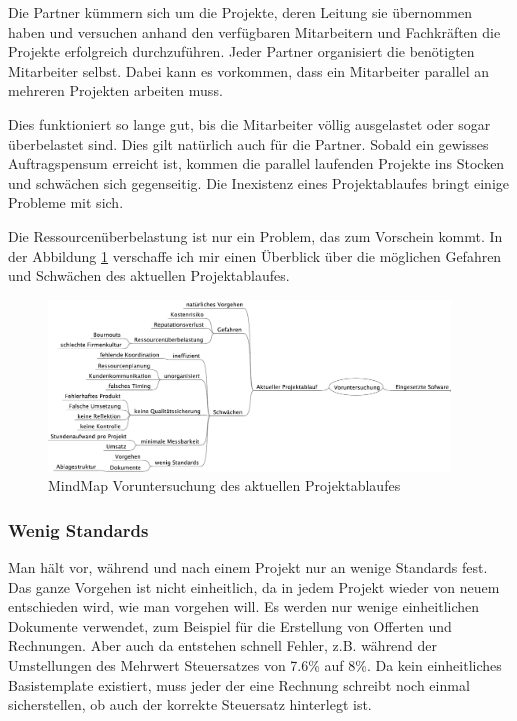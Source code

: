 Die Partner kümmern sich um die Projekte, deren Leitung sie übernommen haben
und versuchen anhand den verfügbaren Mitarbeitern und Fachkräften die Projekte 
erfolgreich durchzuführen. Jeder Partner organisiert die benötigten Mitarbeiter
selbst. Dabei kann es vorkommen, dass ein Mitarbeiter parallel an
mehreren Projekten arbeiten muss.

Dies funktioniert so lange gut, bis die Mitarbeiter völlig ausgelastet oder sogar
überbelastet sind. Dies gilt natürlich auch für die Partner. Sobald ein gewisses 
Auftragspensum erreicht ist, kommen die parallel laufenden Projekte ins Stocken 
und schwächen sich gegenseitig. Die Inexistenz eines Projektablaufes bringt
einige Probleme mit sich.

Die Ressourcenüberbelastung ist nur ein Problem, das zum Vorschein kommt. In der
Abbildung \ref{pic:voruntersuchung_projektablauf} verschaffe ich mir einen 
Überblick über die möglichen Gefahren und Schwächen des aktuellen Projektablaufes.

\begin{figure}[htbp]
\begin{center}
\includegraphics[width=0.95\textwidth,angle=0]{./mindmaps/voruntersuchung_projektablauf.pdf}
\caption{MindMap Voruntersuchung des aktuellen Projektablaufes}
\label{pic:voruntersuchung_projektablauf}
\end{center}
\end{figure}

\subsubsection{Wenig Standards}
Man hält vor, während und nach einem Projekt nur an wenige Standards fest. 
Das ganze Vorgehen ist nicht einheitlich, da in jedem Projekt wieder von
neuem entschieden wird, wie man vorgehen will. Es werden nur wenige einheitlichen
Dokumente verwendet, zum Beispiel für die Erstellung von Offerten und Rechnungen.
Aber auch da entstehen schnell Fehler, z.B. während der Umstellungen des 
Mehrwert Steuersatzes von 7.6\% auf 8\%. Da kein einheitliches Basistemplate
existiert, muss jeder der eine Rechnung schreibt noch einmal sicherstellen, ob
auch der korrekte Steuersatz hinterlegt ist. 

